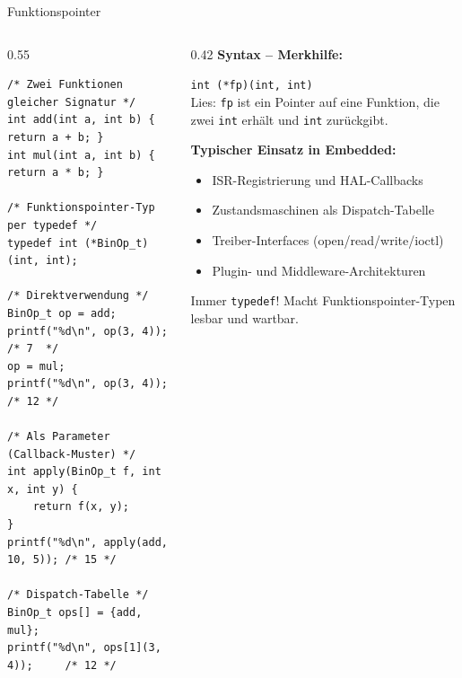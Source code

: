 \documentclass[%
  aspectratio=169,
  10pt
]{beamer}
\begin{document}
\begin{frame}[fragile]{Funktionspointer}
  \begin{columns}[T]
    \begin{column}{0.55\textwidth}
\begin{lstlisting}
/* Zwei Funktionen gleicher Signatur */
int add(int a, int b) { return a + b; }
int mul(int a, int b) { return a * b; }

/* Funktionspointer-Typ per typedef */
typedef int (*BinOp_t)(int, int);

/* Direktverwendung */
BinOp_t op = add;
printf("%d\n", op(3, 4));   /* 7  */
op = mul;
printf("%d\n", op(3, 4));   /* 12 */

/* Als Parameter (Callback-Muster) */
int apply(BinOp_t f, int x, int y) {
    return f(x, y);
}
printf("%d\n", apply(add, 10, 5)); /* 15 */

/* Dispatch-Tabelle */
BinOp_t ops[] = {add, mul};
printf("%d\n", ops[1](3, 4));     /* 12 */
\end{lstlisting}
    \end{column}
    \begin{column}{0.42\textwidth}
      \textbf{Syntax -- Merkhilfe:}
      \begin{block}{}
        \texttt{int (*fp)(int, int)}\\[0.3em]
        \small Lies: \texttt{fp} ist ein Pointer
        auf eine Funktion, die zwei \texttt{int}
        erhält und \texttt{int} zurückgibt.
      \end{block}

      \vspace{0.4em}
      \textbf{Typischer Einsatz in Embedded:}
      \begin{itemize}
        \item ISR-Registrierung und HAL-Callbacks
        \item Zustandsmaschinen als Dispatch-Tabelle
        \item Treiber-Interfaces (open/read/write/ioctl)
        \item Plugin- und Middleware-Architekturen
      \end{itemize}

      \begin{exampleblock}{Immer \texttt{typedef}!}
        Macht Funktionspointer-Typen\\
        lesbar und wartbar.
      \end{exampleblock}
    \end{column}
  \end{columns}
\end{frame}
\end{document}

